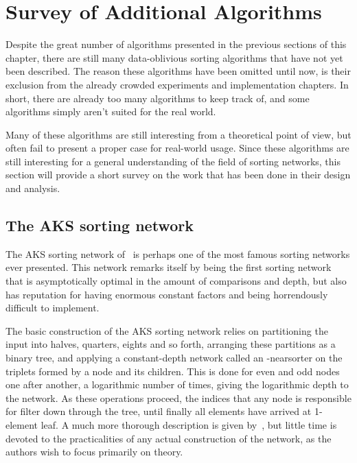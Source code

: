 \FloatBarrier
\section{Survey of Additional Algorithms}

Despite the great number of algorithms presented in the previous sections of this chapter, there are still many data-oblivious sorting algorithms that have not yet been described.
The reason these algorithms have been omitted until now, is their exclusion from the already crowded experiments and implementation chapters.
In short, there are already too many algorithms to keep track of, and some algorithms simply aren't suited for the real world.

Many of these algorithms are still interesting from a theoretical point of view, but often fail to present a proper case for real-world usage.
Since these algorithms are still interesting for a general understanding of the field of sorting networks, this section will provide a short survey on the work that has been done in their design and analysis.

\subsection{The AKS sorting network}

The AKS sorting network of~ is perhaps one of the most famous sorting networks ever presented. 
This network remarks itself by being the first sorting network that is asymptotically optimal in the amount of comparisons and depth, but also has reputation for having enormous constant factors and being horrendously difficult to implement.

The basic construction of the AKS sorting network relies on partitioning the input into halves, quarters, eights and so forth, arranging these partitions as a binary tree, and applying a constant-depth network called an \textepsilon -nearsorter on the triplets formed by a node and its children. This is done for even and odd nodes one after another, a logarithmic number of times, giving the logarithmic depth to the network. As these operations proceed, the indices that any node is responsible for filter down through the tree, until finally all elements have arrived at 1-element leaf. A much more thorough description is given by~, but little time is devoted to the practicalities of any actual construction of the network, as the authors wish to focus primarily on theory.

